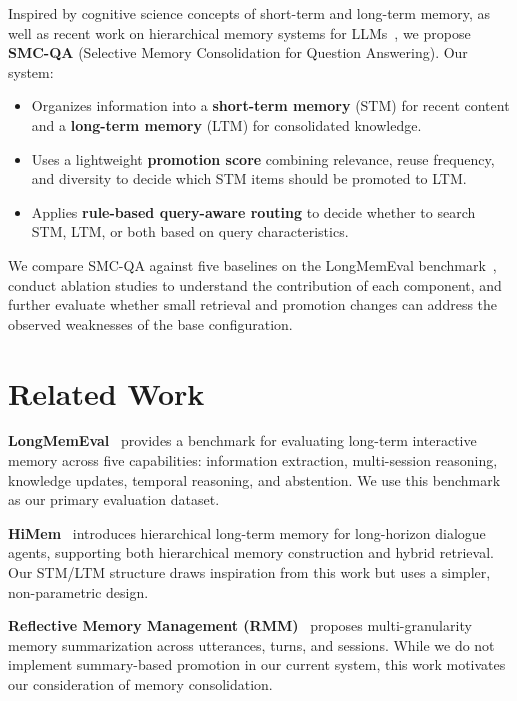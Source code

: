 \documentclass{article}
\begin{document}
Inspired by cognitive science concepts of short-term and long-term memory, as well as recent work on hierarchical memory systems for LLMs~\cite{himem, rmm, lightmem}, we propose \textbf{SMC-QA} (Selective Memory Consolidation for Question Answering). Our system:

\begin{itemize}
    \item Organizes information into a \textbf{short-term memory} (STM) for recent content and a \textbf{long-term memory} (LTM) for consolidated knowledge.
    \item Uses a lightweight \textbf{promotion score} combining relevance, reuse frequency, and diversity to decide which STM items should be promoted to LTM.
    \item Applies \textbf{rule-based query-aware routing} to decide whether to search STM, LTM, or both based on query characteristics.
\end{itemize}

We compare SMC-QA against five baselines on the LongMemEval benchmark~\cite{longmemeval}, conduct ablation studies to understand the contribution of each component, and further evaluate whether small retrieval and promotion changes can address the observed weaknesses of the base configuration.

\section{Related Work}

\textbf{LongMemEval}~\cite{longmemeval} provides a benchmark for evaluating long-term interactive memory across five capabilities: information extraction, multi-session reasoning, knowledge updates, temporal reasoning, and abstention. We use this benchmark as our primary evaluation dataset.

\textbf{HiMem}~\cite{himem} introduces hierarchical long-term memory for long-horizon dialogue agents, supporting both hierarchical memory construction and hybrid retrieval. Our STM/LTM structure draws inspiration from this work but uses a simpler, non-parametric design.

\textbf{Reflective Memory Management (RMM)}~\cite{rmm} proposes multi-granularity memory summarization across utterances, turns, and sessions. While we do not implement summary-based promotion in our current system, this work motivates our consideration of memory consolidation.
\end{document}
